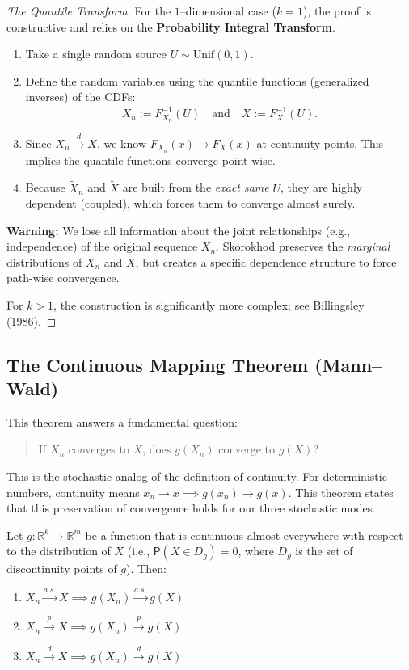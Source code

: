 \begin{proof}[The Quantile Transform]
For the \(1\)--dimensional case ($k=1$), the proof is constructive and relies on the \textbf{Probability Integral Transform}.
\begin{enumerate}
    \item Take a single random source $U \sim \text{Unif}(0, 1)$.
    \item Define the random variables using the quantile functions (generalized inverses) of the CDFs:
    \[ \tilde{X}_n := F_{X_n}^{-1}(U) \quad \text{and} \quad \tilde{X} := F_X^{-1}(U). \]
    \item Since $X_n \xrightarrow{d} X$, we know $F_{X_n}(x) \to F_X(x)$ at continuity points. This implies the quantile functions converge point-wise.
    \item Because $\tilde{X}_n$ and $\tilde{X}$ are built from the \textit{exact same} $U$, they are highly dependent (coupled), which forces them to converge almost surely.
\end{enumerate}

\textbf{Warning:} We lose all information about the joint relationships (e.g., independence) of the original sequence $X_n$. Skorokhod preserves the \textit{marginal} distributions of $X_n$ and $X$, but creates a specific dependence structure to force path-wise convergence.

For $k > 1$, the construction is significantly more complex; see Billingsley (1986).
\end{proof}

\subsection*{The Continuous Mapping Theorem (Mann--Wald)}

This theorem answers a fundamental question: 
\begin{quote}
If $X_n$ converges to $X$, does $g(X_n)$ converge to $g(X)$?
\end{quote}

This is the stochastic analog of the definition of continuity. For deterministic numbers, continuity means $x_n \to x \implies g(x_n) \to g(x)$. This theorem states that this preservation of convergence holds for our three stochastic modes.

\begin{theo}

\label{thm:cmt}

Let $g: \mathbb{R}^k \to \mathbb{R}^m$ be a function that is continuous almost everywhere with respect to the distribution of $X$ (i.e., $\mathsf{P}(X \in D_g) = 0$, where $D_g$ is the set of discontinuity points of $g$). Then:
\begin{enumerate}
    \item $X_n \xrightarrow{a.s.} X \implies g(X_n) \xrightarrow{a.s.} g(X)$
    \item $X_n \xrightarrow{p} X \implies g(X_n) \xrightarrow{p} g(X)$
    \item $X_n \xrightarrow{d} X \implies g(X_n) \xrightarrow{d} g(X)$
\end{enumerate}
\end{theo}



